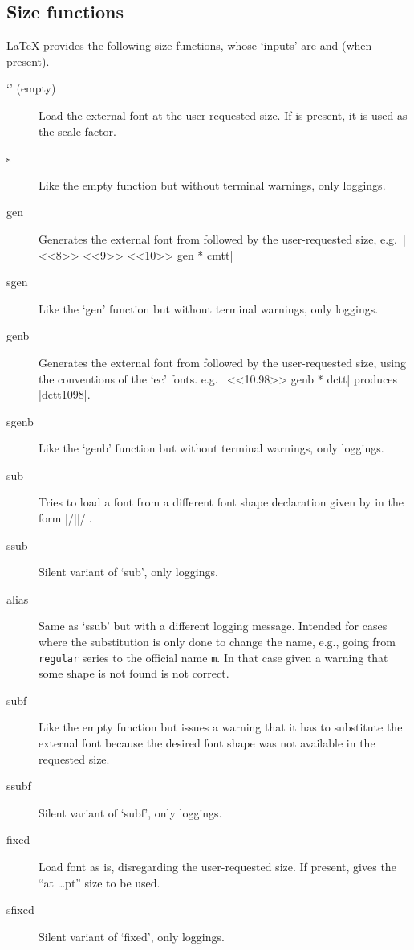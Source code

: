 \documentclass{ltxguide}[1995/11/28]
\begin{document}
 
\subsection{Size functions}
\label{sec:sizefunct}
 
 
\LaTeX{} provides the following size functions, whose `inputs' are
 and  (when present).
 
\begin{description}
\item[`' (empty)]
Load the external font  at the user-requested size. If
 is present, it is used as the scale-factor.
 
\item[s]
Like the empty function but without terminal warnings, only
loggings.
 
\item[gen]
Generates the external font from  followed by
the user-requested size, e.g.~|<<8>> <<9>> <<10>> gen * cmtt|
 
\item[sgen]
Like the `gen' function but without terminal warnings, only loggings.

\item[genb]
Generates the external font from  followed by
the user-requested size, using the conventions of the `ec' fonts.
e.g.~|<<10.98>> genb * dctt| produces |dctt1098|.
 
\item[sgenb]
Like the `genb' function but without terminal warnings, only loggings.
 
\item[sub]
Tries to load a font from a different font shape declaration given by
 in the form |/||/|.
 
\item[ssub]
Silent variant of `sub', only loggings.
 
\item[alias]
Same as `ssub' but with a different logging message. Intended for
cases where the substitution is only done to change the name, e.g.,
going from \texttt{regular} series to the official name \texttt{m}. In
that case given a warning that some shape is not found is not correct.
 
\item[subf]
Like the empty function but issues a warning that it has to substitute
the external font  because the desired font shape was not
available in the requested size.
 
\item[ssubf]
Silent variant of `subf', only loggings.
 
\item[fixed]
Load font  as is, disregarding the user-requested size.
If present,  gives the ``at \ldots pt'' size to be used.
 
\item[sfixed]
Silent variant of `fixed', only loggings.
 
\end{description}
 
\end{document}
